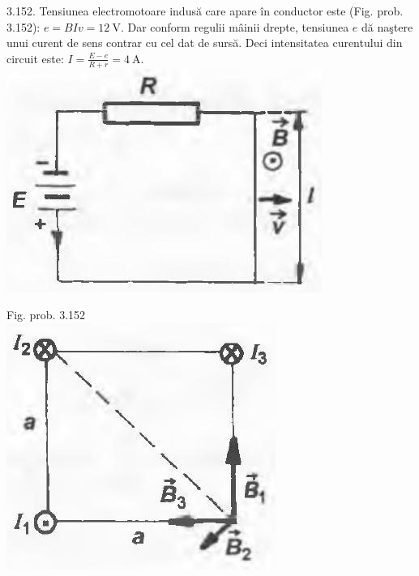 \documentclass[10pt]{article}
\begin{document}
3.152. Tensiunea electromotoare indusă care apare în conductor este (Fig. prob. 3.152): $e=B I v=12 \mathrm{~V}$. Dar conform regulii mâinii drepte, tensiunea $e$ dă naştere unui curent de sens contrar cu cel dat de sursă. Deci intensitatea curentului din circuit este: $I=\frac{E-e}{R+r}=4 \mathrm{~A}$.\\
\includegraphics[max width=\textwidth, center]{2025_07_01_5b3ff9fa0d508c8e9f17g-371(1)}

Fig. prob. 3.152\\
\includegraphics[max width=\textwidth, center]{2025_07_01_5b3ff9fa0d508c8e9f17g-371}
\end{document}
